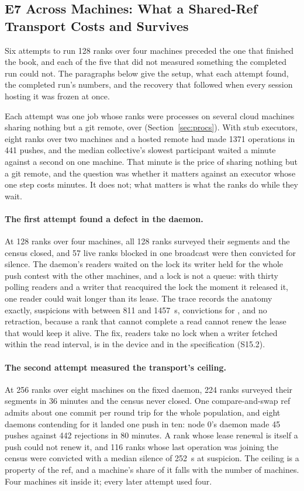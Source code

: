 \subsection{E7 Across Machines: What a Shared-Ref Transport Costs and Survives}
\label{sec:eval-e7-nodes}

Six attempts to run 128 ranks over four machines preceded the one that finished
the book, and each of the five that did not measured something the completed
run could not. The paragraphs below give the setup, what each attempt found, the
completed run's numbers, and the recovery that followed when every session
hosting it was frozen at once.

Each attempt was one job whose ranks were processes on several cloud machines
sharing nothing but a git remote, over 
(Section~\ref{sec:procs}). With stub executors, eight ranks over two machines
and a hosted remote had made 1371 operations in 441 pushes, and the median
collective's slowest participant waited a minute against a second on one
machine. That minute is the price of sharing nothing but a git remote, and the
question was whether it matters against an executor whose one step costs
minutes. It does not; what matters is what the ranks do while they wait.

\paragraph{The first attempt found a defect in the daemon.} At 128 ranks over
four machines, all 128 ranks surveyed their segments and the census closed, and
57 live ranks blocked in one broadcast were then convicted for silence. The
daemon's readers waited on the lock its writer held for the whole push contest
with the other machines, and a lock is not a queue: with thirty polling readers
and a writer that reacquired the lock the moment it released it, one reader
could wait longer than its lease. The trace records the anatomy exactly,
suspicions with  between 811 and 1457~s, convictions for
, and no retraction, because a rank that cannot complete a
read cannot renew the lease that would keep it alive. The fix, readers take no
lock when a writer fetched within the read interval, is in the device and in the
specification (S15.2).

\paragraph{The second attempt measured the transport's ceiling.} At 256 ranks
over eight machines on the fixed daemon, 224 ranks surveyed their segments in
36 minutes and the census never closed. One compare-and-swap ref admits about
one commit per round trip for the whole population, and eight daemons contending
for it landed one push in ten: node 0's daemon made 45 pushes against 442
rejections in 80 minutes. A rank whose lease renewal is itself a push could not
renew it, and 116 ranks whose last operation was joining the census were
convicted with a median silence of 252~s at suspicion. The ceiling is a property
of the ref, and a machine's share of it falls with the number of machines. Four
machines sit inside it; every later attempt used four.

